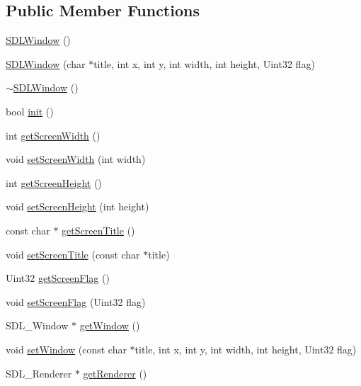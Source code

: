 \subsection*{Public Member Functions}
\begin{DoxyCompactItemize}
\item 
\hyperlink{class_s_d_l_window_ab081329db76eaeaed1716c2e3bad50b2}{S\+D\+L\+Window} ()
\item 
\hyperlink{class_s_d_l_window_a9f42587fe7eeda9b87e060bf74891338}{S\+D\+L\+Window} (char $\ast$title, int x, int y, int width, int height, Uint32 flag)
\item 
\hyperlink{class_s_d_l_window_a7a0af0daec54970ff2262b67a6ece281}{$\sim$\+S\+D\+L\+Window} ()
\item 
bool \hyperlink{class_s_d_l_window_ad0f1f0b8510c97c1eeeffffe30707b0c}{init} ()
\item 
int \hyperlink{class_s_d_l_window_ad9bd55d793deb62b26932c5e1b8c1042}{get\+Screen\+Width} ()
\item 
void \hyperlink{class_s_d_l_window_a36930c7e4f3dee77c19283a3ede6287d}{set\+Screen\+Width} (int width)
\item 
int \hyperlink{class_s_d_l_window_ae3220fe9d6ef946c50713c7e4b72d637}{get\+Screen\+Height} ()
\item 
void \hyperlink{class_s_d_l_window_ae80e9b827e6c2138f1506841a60a072b}{set\+Screen\+Height} (int height)
\item 
const char $\ast$ \hyperlink{class_s_d_l_window_a7a21e853e2875a2a2324a59eefd04057}{get\+Screen\+Title} ()
\item 
void \hyperlink{class_s_d_l_window_a1be36c2e5e329d203e929d59f2d5c308}{set\+Screen\+Title} (const char $\ast$title)
\item 
Uint32 \hyperlink{class_s_d_l_window_adec65d41c9403d18cc23389a62f1897a}{get\+Screen\+Flag} ()
\item 
void \hyperlink{class_s_d_l_window_a032e69e9664f4cfdb3e27e82d3bab986}{set\+Screen\+Flag} (Uint32 flag)
\item 
S\+D\+L\+\_\+\+Window $\ast$ \hyperlink{class_s_d_l_window_a7b170e4afb9920aba42be65369cf98eb}{get\+Window} ()
\item 
void \hyperlink{class_s_d_l_window_ad14a7b1965115315210ba34b7239e598}{set\+Window} (const char $\ast$title, int x, int y, int width, int height, Uint32 flag)
\item 
S\+D\+L\+\_\+\+Renderer $\ast$ \hyperlink{class_s_d_l_window_a9a6d80f754ee6209be95d6c964dea85e}{get\+Renderer} ()
\end{DoxyCompactItemize}
